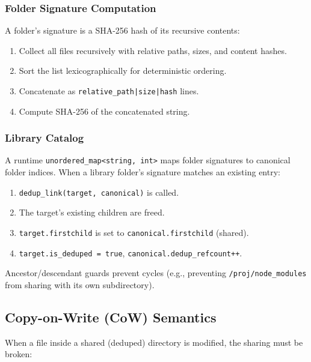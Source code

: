 \documentclass[12pt, a4paper]{article}
\begin{document}
\subsubsection{Folder Signature Computation}

A folder's signature is a SHA-256 hash of its recursive contents:

\begin{enumerate}
  \item Collect all files recursively with relative paths, sizes, and content hashes.
  \item Sort the list lexicographically for deterministic ordering.
  \item Concatenate as \texttt{relative\_path|size|hash} lines.
  \item Compute SHA-256 of the concatenated string.
\end{enumerate}

\subsubsection{Library Catalog}

A runtime \texttt{unordered\_map<string, int>} maps folder signatures to canonical folder indices. When a library folder's signature matches an existing entry:

\begin{enumerate}
  \item \texttt{dedup\_link(target, canonical)} is called.
  \item The target's existing children are freed.
  \item \texttt{target.firstchild} is set to \texttt{canonical.firstchild} (shared).
  \item \texttt{target.is\_deduped = true}, \texttt{canonical.dedup\_refcount++}.
\end{enumerate}

Ancestor/descendant guards prevent cycles (e.g., preventing \texttt{/proj/node\_modules} from sharing with its own subdirectory).

\subsection{Copy-on-Write (CoW) Semantics}

When a file inside a shared (deduped) directory is modified, the sharing must be broken:
\end{document}
